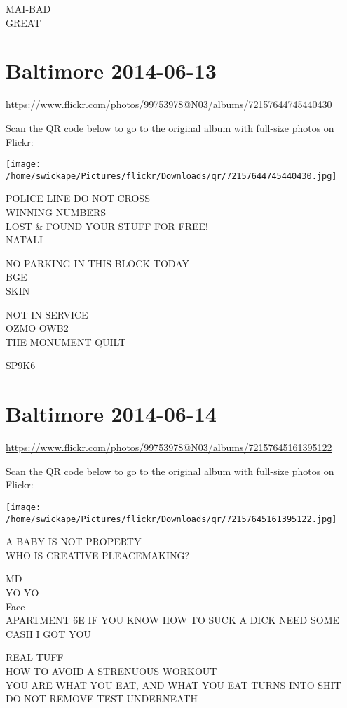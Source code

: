 \documentclass[10pt,letterpaper]{article}
\begin{document}
MAI{-}BAD\\
GREAT
\pagebreak

\section*{Baltimore 2014-06-13}

\url{https://www.flickr.com/photos/99753978@N03/albums/72157644745440430}

Scan the QR code below to go to the original album with full-size photos on Flickr:

\texttt{[image: /home/swickape/Pictures/flickr/Downloads/qr/72157644745440430.jpg]}
\pagebreak

POLICE LINE DO NOT CROSS\\
WINNING NUMBERS\\
LOST \& FOUND YOUR STUFF FOR FREE!\\
NATALI

NO PARKING IN THIS BLOCK TODAY\\
BGE\\
SKIN

NOT IN SERVICE\\
OZMO OWB2\\
THE MONUMENT QUILT

SP9K6
\pagebreak

\section*{Baltimore 2014-06-14}

\url{https://www.flickr.com/photos/99753978@N03/albums/72157645161395122}

Scan the QR code below to go to the original album with full-size photos on Flickr:

\texttt{[image: /home/swickape/Pictures/flickr/Downloads/qr/72157645161395122.jpg]}
\pagebreak

A BABY IS NOT PROPERTY\\
WHO IS CREATIVE PLEACEMAKING?

MD\\
YO YO\\
Face\\
APARTMENT 6E IF YOU KNOW HOW TO SUCK A DICK NEED SOME CASH I GOT YOU

REAL TUFF\\
HOW TO AVOID A STRENUOUS WORKOUT\\
YOU ARE WHAT YOU EAT, AND WHAT YOU EAT TURNS INTO SHIT\\
DO NOT REMOVE TEST UNDERNEATH
\end{document}
